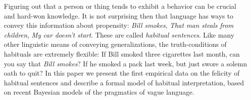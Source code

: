 \documentclass[10pt,letterpaper]{article}
\begin{document}
Figuring out that a person or thing tends to exhibit a behavior can be crucial and hard-won knowledge.
It is not surprising then that language has ways to convey this information about propensity:
\emph{Bill smokes}, \emph{That man steals from children}, \emph{My car doesn't start}.
These are called \emph{habitual sentences}.
Like many other linguistic means of conveying generalizations, the truth-conditions of habituals are extremely flexible:
If Bill smoked three cigarettes last month, can you say that \emph{Bill smokes}? %
If he smoked a pack last week, but just swore a solemn oath to quit?
In this paper we present the first empirical data on the felicity of habitual sentences and describe a formal model of habitual interpretation, based on recent Bayesian models of the pragmatics of vague language.





\end{document}
